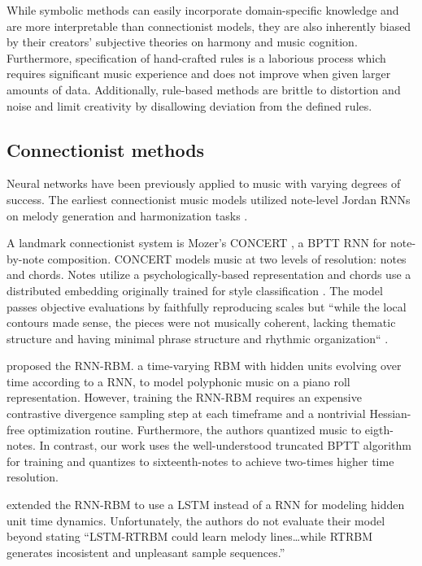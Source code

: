 \documentclass[dissertation.tex]{subfiles}
\begin{document}
While symbolic methods can easily incorporate domain-specific knowledge and are
more interpretable than connectionist models, they are also inherently biased
by their creators' subjective theories on harmony and music cognition.
Furthermore, specification of hand-crafted rules is a laborious process which
requires significant music experience and does not improve when given larger
amounts of data. Additionally, rule-based methods are brittle to distortion and
noise and limit creativity by disallowing deviation from the defined rules.

\subsection{Connectionist methods}

Neural networks have been previously applied to music with varying degrees of
success\cite{griffith1999musical}. The earliest connectionist music models
utilized note-level Jordan RNNs on melody generation and harmonization tasks
\cite{todd1988sequential} \cite{todd1989connectionist}
\cite{bharucha1989modeling}. 

A landmark connectionist system is Mozer's CONCERT \cite{mozer1994neural}, a
BPTT RNN for note-by-note composition. CONCERT models music at two
levels of resolution: notes and chords. Notes utilize a psychologically-based
representation \cite{shepard1982geometrical} and chords use a distributed
embedding originally trained for style classification
\cite{laden1989representation}. The model passes objective evaluations by
faithfully reproducing scales but ``while the local contours made sense, the
pieces were not musically coherent, lacking thematic structure and having
minimal phrase structure and rhythmic organization`` \cite{mozer1994neural}.

\cite{Boulanger-Lewandowski2012} proposed the RNN-RBM. a time-varying RBM with
hidden units evolving over time according to a RNN, to model polyphonic music
on a piano roll representation. However, training the RNN-RBM requires an
expensive contrastive divergence sampling step at each timeframe and a
nontrivial Hessian-free optimization routine. Furthermore, the authors
quantized music to eigth-notes. In contrast, our work uses the well-understood
truncated BPTT algorithm for training and quantizes to sixteenth-notes to achieve
two-times higher time resolution.

\cite{Lyu2015} extended the RNN-RBM\cite{Boulanger-Lewandowski2012} to use a
LSTM instead of a RNN for modeling hidden unit time dynamics. Unfortunately,
the authors do not evaluate their model beyond stating ``LSTM-RTRBM could learn
melody lines\ldots while RTRBM generates incosistent and unpleasant sample
sequences.''
\end{document}
